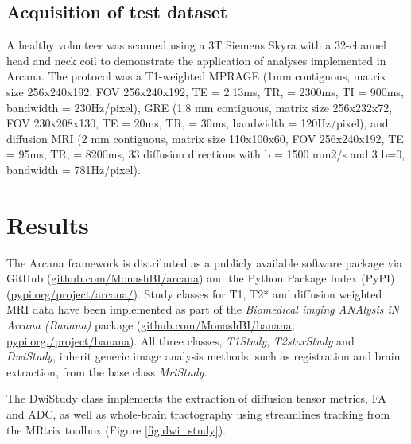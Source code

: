 \documentclass[smallextended]{svjour3}       %
\begin{document}
\subsection*{Acquisition of test dataset}

A healthy volunteer was scanned using a 3T Siemens Skyra with a 32-channel head
and neck coil to demonstrate the application of analyses implemented in
Arcana. The protocol was a T1-weighted MPRAGE (1mm contiguous,
matrix size 256x240x192, FOV 256x240x192, TE = 2.13ms, TR, = 2300ms, TI
= 900ms, bandwidth = 230Hz/pixel), GRE (1.8 mm contiguous, matrix size
256x232x72, FOV 230x208x130, TE = 20ms, TR, = 30ms,
bandwidth = 120Hz/pixel), and diffusion MRI (2 mm contiguous, matrix size
110x100x60, FOV 256x240x192, TE = 95ms, TR, = 8200ms, 33 diffusion
directions with b = 1500 mm2/s and 3 b=0, bandwidth = 781Hz/pixel).

\section*{Results}
\label{results}

The Arcana framework is distributed as a publicly available software
package via GitHub (\url{github.com/MonashBI/arcana}) and the
Python Package Index (PyPI) (\url{pypi.org/project/arcana/}).
Study classes for T1, T2* and diffusion weighted MRI data have been
implemented as part of the \emph{Biomedical imging ANAlysis iN Arcana (Banana)} package
(\url{github.com/MonashBI/banana}; \url{pypi.org./project/banana}).
All three classes, \emph{T1Study}, \emph{T2starStudy} and
\emph{DwiStudy}, inherit generic image analysis methods, such as
registration and brain extraction, from the base class \emph{MriStudy}.

The DwiStudy class implements the extraction of diffusion tensor metrics,
FA and ADC, as well as whole-brain tractography using streamlines tracking from the MRtrix
toolbox \citep{tournier_improved_2010,tournier_mrtrix:_2012} (Figure \ref{fig:dwi_study}).
\end{document}
